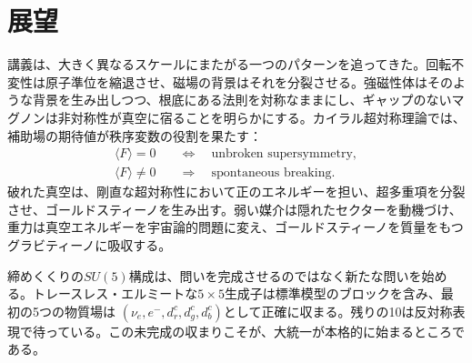 \begin{classroomqa}
\end{classroomqa}

\section{展望}

講義は、大きく異なるスケールにまたがる一つのパターンを追ってきた。回転不変性は原子準位を縮退させ、磁場の背景はそれを分裂させる。強磁性体はそのような背景を生み出しつつ、根底にある法則を対称なままにし、ギャップのないマグノンは非対称性が真空に宿ることを明らかにする。カイラル超対称理論では、補助場の期待値が秩序変数の役割を果たす：
\begin{equation}
\begin{aligned}
\langle F\rangle=0
&\quad\Longleftrightarrow\quad
\text{unbroken supersymmetry},\\
\langle F\rangle\neq0
&\quad\Longrightarrow\quad
\text{spontaneous breaking}.
\end{aligned}
\end{equation}
破れた真空は、剛直な超対称性において正のエネルギーを担い、超多重項を分裂させ、ゴールドスティーノを生み出す。弱い媒介は隠れたセクターを動機づけ、重力は真空エネルギーを宇宙論的問題に変え、ゴールドスティーノを質量をもつグラビティーノに吸収する。

締めくくりの\(SU(5)\)構成は、問いを完成させるのではなく新たな問いを始める。トレースレス・エルミートな\(5\times5\)生成子は標準模型のブロックを含み、最初の5つの物質場は
\((\nu_e,e^-,d^c_r,d^c_g,d^c_b)\)として正確に収まる。残りの10は反対称表現で待っている。この未完成の収まりこそが、大統一が本格的に始まるところである。
